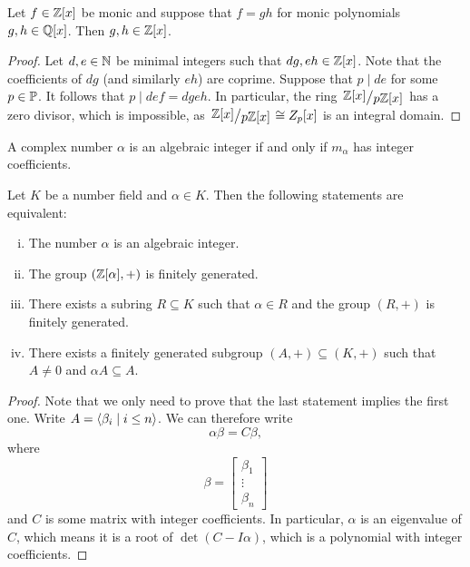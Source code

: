\begin{lema}
Let $f \in \Z[x]$ be monic and suppose that $f = gh$ for monic
polynomials $g, h \in \Q[x]$. Then $g, h \in \Z[x]$.
\end{lema}

\begin{proof}
Let $d, e \in \N$ be minimal integers such that $dg, eh \in \Z[x]$.
Note that the coefficients of $dg$ (and similarly $eh$) are
coprime. Suppose that $p \mid de$ for some $p \in \P$. It follows
that $p \mid def = dg eh$. In particular, the ring
$\kvoc{\Z[x]}{p \Z[x]}$ has a zero divisor, which is impossible, as
$\kvoc{\Z[x]}{p \Z[x]} \cong Z_p[x]$ is an integral domain.
\end{proof}

\begin{lema}
A complex number $\alpha$ is an algebraic integer if and only if
$m_\alpha$ has integer coefficients.
\end{lema}

\obvs

\begin{trditev}
Let $K$ be a number field and $\alpha \in K$. Then the following
statements are equivalent:

\begin{enumerate}[i)]
\item The number $\alpha$ is an algebraic integer.
\item The group $(\Z[\alpha], +)$ is finitely generated.
\item There exists a subring $R \subseteq K$ such that
$\alpha \in R$ and the group $(R, +)$ is finitely generated.
\item There exists a finitely generated subgroup
$(A, +) \subseteq (K, +)$ such that $A \ne 0$ and
$\alpha A \subseteq A$.
\end{enumerate}
\end{trditev}

\begin{proof}
Note that we only need to prove that the last statement implies the
first one. Write $A = \skl{\beta_i \mid i \leq n}$. We can
therefore write
\[
\alpha \beta = C \beta,
\]
where
\[
\beta =
\begin{bmatrix}
\beta_1 \\ \vdots \\ \beta_n
\end{bmatrix}
\]
and $C$ is some matrix with integer coefficients. In particular,
$\alpha$ is an eigenvalue of $C$, which means it is a root of
$\det(C - I \alpha)$, which is a polynomial with integer
coefficients.
\end{proof}


